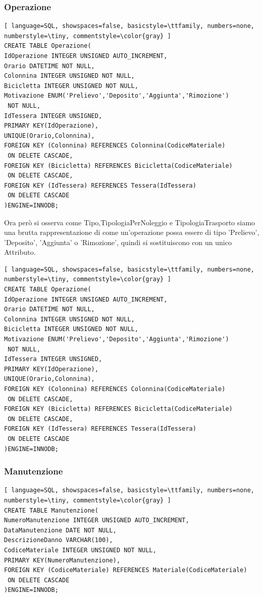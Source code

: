 \documentclass[a4paper,twoside]{article}
\begin{document}
\subsubsection{Operazione}
\begin{lstlisting}[ language=SQL, showspaces=false, basicstyle=\ttfamily, numbers=none, numberstyle=\tiny, commentstyle=\color{gray} ]
CREATE TABLE Operazione(
IdOperazione INTEGER UNSIGNED AUTO_INCREMENT,
Orario DATETIME NOT NULL,
Colonnina INTEGER UNSIGNED NOT NULL,
Bicicletta INTEGER UNSIGNED NOT NULL,
Motivazione ENUM('Prelievo','Deposito','Aggiunta','Rimozione')
 NOT NULL,
IdTessera INTEGER UNSIGNED,
PRIMARY KEY(IdOperazione),
UNIQUE(Orario,Colonnina),
FOREIGN KEY (Colonnina) REFERENCES Colonnina(CodiceMateriale)
 ON DELETE CASCADE,
FOREIGN KEY (Bicicletta) REFERENCES Bicicletta(CodiceMateriale)
 ON DELETE CASCADE,
FOREIGN KEY (IdTessera) REFERENCES Tessera(IdTessera)
 ON DELETE CASCADE
)ENGINE=INNODB;
\end{lstlisting}
Ora però si osserva come Tipo,TipologiaPerNoleggio e TipologiaTrasporto siamo una brutta rappresentazione di come un'operazione possa essere di tipo 'Prelievo', 'Deposito', 'Aggiunta' o 'Rimozione', quindi si sostituiscono con un unico Attributo.
\begin{lstlisting}[ language=SQL, showspaces=false, basicstyle=\ttfamily, numbers=none, numberstyle=\tiny, commentstyle=\color{gray} ]
CREATE TABLE Operazione(
IdOperazione INTEGER UNSIGNED AUTO_INCREMENT,
Orario DATETIME NOT NULL,
Colonnina INTEGER UNSIGNED NOT NULL,
Bicicletta INTEGER UNSIGNED NOT NULL,
Motivazione ENUM('Prelievo','Deposito','Aggiunta','Rimozione')
 NOT NULL,
IdTessera INTEGER UNSIGNED,
PRIMARY KEY(IdOperazione),
UNIQUE(Orario,Colonnina),
FOREIGN KEY (Colonnina) REFERENCES Colonnina(CodiceMateriale)
 ON DELETE CASCADE,
FOREIGN KEY (Bicicletta) REFERENCES Bicicletta(CodiceMateriale)
 ON DELETE CASCADE,
FOREIGN KEY (IdTessera) REFERENCES Tessera(IdTessera)
 ON DELETE CASCADE
)ENGINE=INNODB;
\end{lstlisting}
\subsubsection{Manutenzione}
\begin{lstlisting}[ language=SQL, showspaces=false, basicstyle=\ttfamily, numbers=none, numberstyle=\tiny, commentstyle=\color{gray} ]
CREATE TABLE Manutenzione(
NumeroManutenzione INTEGER UNSIGNED AUTO_INCREMENT,
DataManutenzione DATE NOT NULL,
DescrizioneDanno VARCHAR(100),
CodiceMateriale INTEGER UNSIGNED NOT NULL,
PRIMARY KEY(NumeroManutenzione),
FOREIGN KEY (CodiceMateriale) REFERENCES Materiale(CodiceMateriale)
 ON DELETE CASCADE
)ENGINE=INNODB;
\end{lstlisting}
\end{document}

